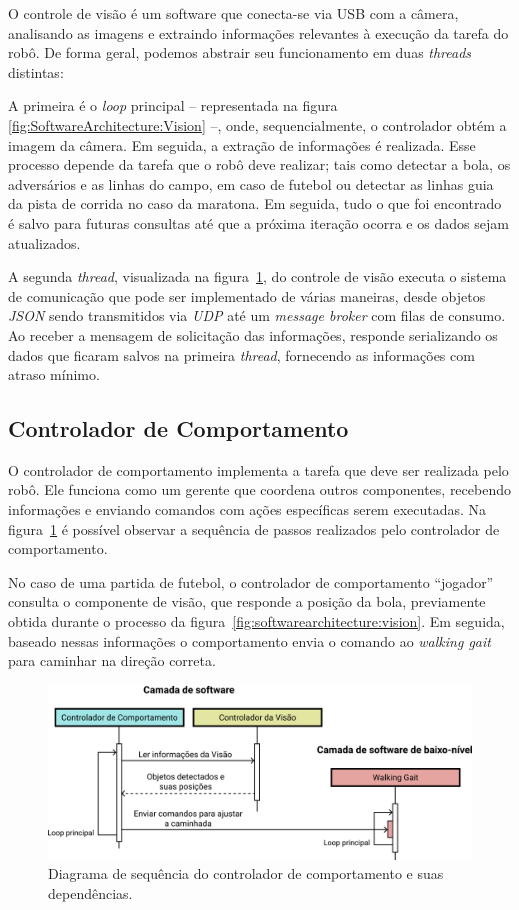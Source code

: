 O controle de visão é um software que conecta-se via USB com a câmera, analisando as imagens e extraindo informações relevantes à execução da tarefa do robô. De forma geral, podemos abstrair seu funcionamento em duas \textit{threads} distintas:

A primeira é o \textit{loop} principal -- representada na figura \ref{fig:SoftwareArchitecture:Vision} --, onde, sequencialmente, o controlador obtém a imagem da câmera. Em seguida, a extração de informações é realizada. Esse processo depende da tarefa que o robô deve realizar; tais como detectar a bola, os adversários e as linhas do campo, em caso de futebol ou detectar as linhas guia da pista de corrida no caso da maratona. Em seguida, tudo o que foi encontrado é salvo para futuras consultas até que a próxima iteração ocorra e os dados sejam atualizados.

A segunda \textit{thread}, visualizada na figura~\ref{fig:softwarearchitecture:software}, do controle de visão executa o sistema de comunicação que pode ser implementado de várias maneiras, desde objetos \textit{JSON} sendo transmitidos via \textit{UDP} até um \textit{message broker} com filas de consumo. Ao receber a mensagem de solicitação das informações, responde serializando os dados que ficaram salvos na primeira \textit{thread}, fornecendo as informações com atraso mínimo.

\subsection{Controlador de Comportamento}

O controlador de comportamento implementa a tarefa que deve ser realizada pelo robô. Ele funciona como um gerente que coordena outros componentes, recebendo informações e enviando comandos com ações específicas serem executadas. Na figura~\ref{fig:softwarearchitecture:software} é possível observar a sequência de passos realizados pelo controlador de comportamento.

No caso de uma partida de futebol, o controlador de comportamento ``jogador'' consulta o componente de visão, que responde a posição da bola, previamente obtida durante o processo da figura~\ref{fig:softwarearchitecture:vision}. Em seguida, baseado nessas informações o comportamento envia o comando ao \textit{walking gait} para caminhar na direção correta.

\begin{figure}[h!]
	\centering
	\includegraphics[scale=1]{imagens/svg/softwarearchitecture-software}
	\caption{Diagrama de sequência do controlador de comportamento e suas dependências.}
	\label{fig:softwarearchitecture:software}
\end{figure}

